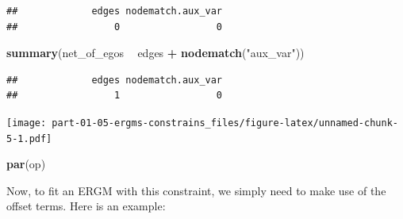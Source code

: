 \documentclass[]{book}
\newenvironment{Shaded}{\begin{snugshade}}{\end{snugshade}}
\newcommand{\CommentTok}[1]{\textcolor[rgb]{0.56,0.35,0.01}{\textit{#1}}}
\newcommand{\DataTypeTok}[1]{\textcolor[rgb]{0.13,0.29,0.53}{#1}}
\newcommand{\DecValTok}[1]{\textcolor[rgb]{0.00,0.00,0.81}{#1}}
\newcommand{\KeywordTok}[1]{\textcolor[rgb]{0.13,0.29,0.53}{\textbf{#1}}}
\newcommand{\NormalTok}[1]{#1}
\newcommand{\OperatorTok}[1]{\textcolor[rgb]{0.81,0.36,0.00}{\textbf{#1}}}
\newcommand{\StringTok}[1]{\textcolor[rgb]{0.31,0.60,0.02}{#1}}
\begin{document}
\begin{verbatim}
##             edges nodematch.aux_var 
##                 0                 0
\end{verbatim}

\begin{Shaded}
\begin{Highlighting}[]
\KeywordTok{summary}\NormalTok{(net_of_egos }\OperatorTok{~}\StringTok{ }\NormalTok{edges }\OperatorTok{+}\StringTok{ }\KeywordTok{nodematch}\NormalTok{(}\StringTok{"aux_var"}\NormalTok{))}
\end{Highlighting}
\end{Shaded}

\begin{verbatim}
##             edges nodematch.aux_var 
##                 1                 0
\end{verbatim}

\begin{Shaded}
\end{Shaded}

\texttt{[image: part-01-05-ergms-constrains\_files/figure-latex/unnamed-chunk-5-1.pdf]}

\begin{Shaded}
\begin{Highlighting}[]
\KeywordTok{par}\NormalTok{(op)}
\end{Highlighting}
\end{Shaded}

Now, to fit an ERGM with this constraint, we simply need to make use of
the offset terms. Here is an example:
\end{document}

